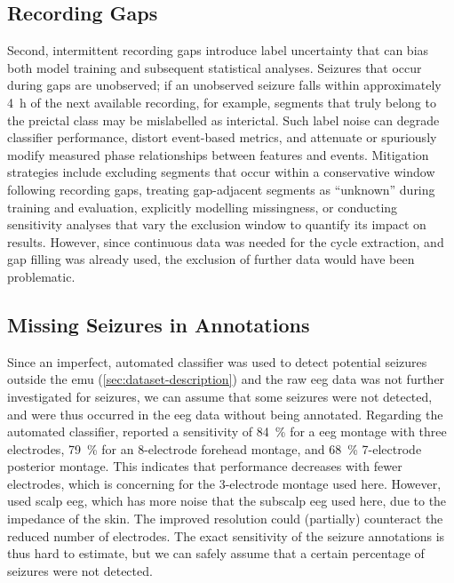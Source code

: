 \subsection{Recording Gaps} 
Second, intermittent recording gaps introduce label uncertainty that can bias both model training and subsequent statistical analyses.
Seizures that occur during gaps are unobserved; if an unobserved seizure falls within approximately \SI{4}{\hour} of the next available recording, for example, segments that truly belong to the preictal class may be mislabelled as interictal.
Such label noise can degrade classifier performance, distort event-based metrics, and attenuate or spuriously modify measured phase relationships between features and events.
Mitigation strategies include excluding segments that occur within a conservative window following recording gaps, treating gap-adjacent segments as ``unknown'' during training and evaluation, explicitly modelling missingness, or conducting sensitivity analyses that vary the exclusion window to quantify its impact on results.
However, since continuous data was needed for the cycle extraction, and gap filling was already used, the exclusion of further data would have been problematic.

\subsection{Missing Seizures in Annotations}
Since an imperfect, automated classifier was used to detect potential seizures outside the \gls{emu} (\cref{sec:dataset-description}) and the raw \gls{eeg} data was not further investigated for seizures, we can assume that some seizures were not detected, and were thus occurred in the \gls{eeg} data without being annotated.
Regarding the automated classifier, \textcite{furbass_automatic_2017} reported a sensitivity of \SI{84}{\percent} for a \gls{eeg} montage with three electrodes, \SI{79}{\percent} for an 8-electrode forehead montage, and \SI{68}{\percent} 7-electrode posterior montage.
This indicates that performance decreases with fewer electrodes, which is concerning for the 3-electrode montage used here.
However, \textcite{furbass_automatic_2017} used scalp \gls{eeg}, which has more noise that the subscalp \gls{eeg} used here, due to the impedance of the skin.
The improved resolution could (partially) counteract the reduced number of electrodes.
The exact sensitivity of the seizure annotations is thus hard to estimate, but we can safely assume that a certain percentage of seizures were not detected.

